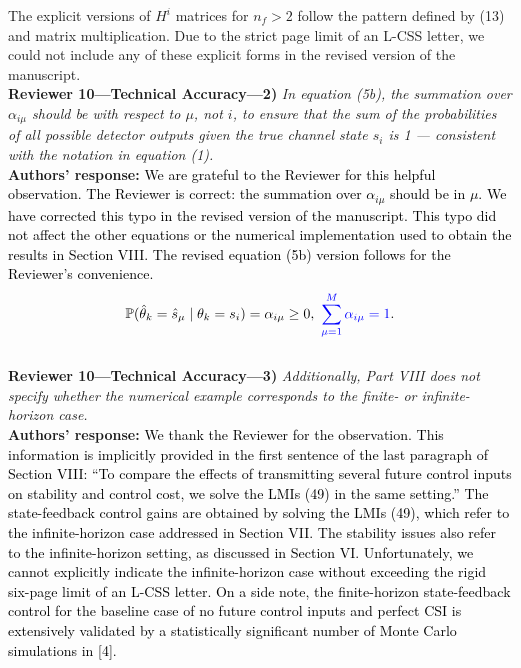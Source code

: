 The explicit versions of $H^i$ matrices for $n_f>2$ follow the pattern defined by (13) and matrix multiplication. Due to the strict page limit of an L-CSS letter, we could not include any of these explicit forms in the revised version of the manuscript.\\[4mm]
\textbf{Reviewer 10---Technical Accuracy---2)}\textit{ %
In equation (5b), the summation over $\alpha_{i\mu}$ should
be with respect to $\mu$, not $i$, to ensure that the sum of the probabilities of all possible detector outputs given the true channel state $s_i$ is 1 --- consistent with the notation in equation (1).}\\[2mm]
\textbf{Authors' response:} \textcolor{black}{We are grateful to the Reviewer for this helpful observation. The Reviewer is correct: the summation over $\alpha_{i\mu}$ should be in $\mu$. We have corrected this typo in the revised version of the manuscript. This typo did not affect the other equations or the numerical implementation used to obtain the results in Section VIII. The revised equation (5b) version follows for the Reviewer's convenience.}
\begin{equation*}
   \mathbb{P}(\hat{\theta}_{k} = \hat{s}_{\mu} \mid \theta_{k} = s_i) = \alpha_{i\mu} \geq 0,~ \textcolor{blue}{\sum_{\mu=1}^M \alpha_{i\mu}= 1}.
\end{equation*}
\\[2mm]
\textbf{Reviewer 10---Technical Accuracy---3)}\textit{ %
Additionally, Part VIII does not specify whether the numerical example corresponds to the finite- or infinite-horizon case.}\\[2mm]
\textbf{Authors' response:} \textcolor{black}{We thank the Reviewer for the observation. This information is implicitly provided in the first sentence of the last paragraph of Section VIII: ``To compare the effects of transmitting several future control inputs on stability and control cost, we solve the LMIs (49) in the same setting.'' The state-feedback control gains are obtained by solving the LMIs (49), which refer to the infinite-horizon case addressed in Section VII. The stability issues also refer to the infinite-horizon setting, as discussed in Section VI. Unfortunately, we cannot explicitly indicate the infinite-horizon case without exceeding the rigid six-page limit of an L-CSS letter. On a side note, the finite-horizon state-feedback control for the baseline case of no future control inputs and perfect CSI is extensively validated by a statistically significant number of Monte Carlo simulations in [4].}\\[4mm]
